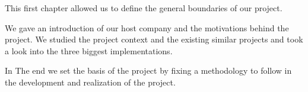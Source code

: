 \begin{spacing}{1.2}
This first chapter allowed us to define the general boundaries of our project.

We gave an introduction of our host company and the motivations behind the project.
We studied the project context and the existing similar projects and took a look into the three biggest implementations.

In The end we set the basis of the project by fixing a methodology to follow in the development and realization of the project.





\end{spacing}
